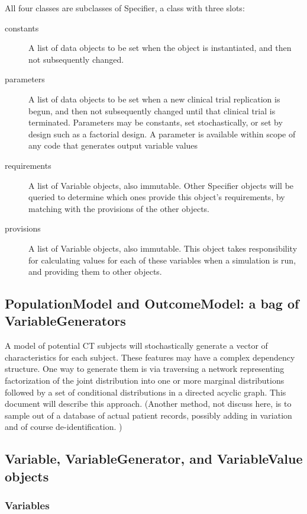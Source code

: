 \documentclass[12pt]{amsart}
\begin{document}
All four classes are subclasses of Specifier, a class with three slots:
\begin{description}
\item[constants] A list of data objects to be set when the object is instantiated, 
and then not subsequently changed. 
\item[ parameters] A list of data objects to be set when a new clinical trial replication is begun, 
and then not subsequently changed until that clinical trial is terminated. Parameters may
be constants, set stochastically, or set by design such as a factorial design. 
A parameter is  available within scope of any code that generates output variable values  
\item[ requirements] A list of Variable objects, also immutable. Other Specifier objects  will be queried to determine which ones provide this object's requirements, by matching with the provisions of the other  objects. 
\item[ provisions] A list of Variable objects, also immutable. This object takes responsibility for calculating values for each of these variables when a simulation is run, and providing them to other objects. 
\end{description}


\subsection{PopulationModel and OutcomeModel: a bag of VariableGenerators}


A model of potential CT subjects will stochastically generate a
vector of characteristics for each subject.
These features may have a complex dependency structure.
One way to generate them is via traversing a network 
representing factorization of the joint distribution into
one or more marginal distributions followed by  a set
of conditional distributions in a directed acyclic graph.
This document will describe this approach. 
(Another method, not discuss here, is to sample out of a database of actual patient records,
 possibly adding in variation and of course de-identification. )



\subsection{Variable, VariableGenerator, and VariableValue objects}

\subsubsection{Variables}
\end{document}
